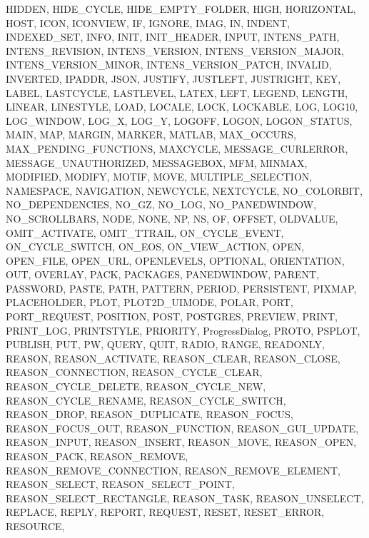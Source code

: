 {{    HIDDEN,
    HIDE_CYCLE,
    HIDE_EMPTY_FOLDER,
    HIGH,
    HORIZONTAL,
    HOST,
    ICON,
    ICONVIEW,
    IF,
    IGNORE,
    IMAG,
    IN,
    INDENT,
    INDEXED_SET,
    INFO,
    INIT,
    INIT_HEADER,
    INPUT,
    INTENS_PATH,
    INTENS_REVISION,
    INTENS_VERSION,
    INTENS_VERSION_MAJOR,
    INTENS_VERSION_MINOR,
    INTENS_VERSION_PATCH,
    INVALID,
    INVERTED,
    IPADDR,
    JSON,
    JUSTIFY,
    JUSTLEFT,
    JUSTRIGHT,
    KEY,
    LABEL,
    LASTCYCLE,
    LASTLEVEL,
    LATEX,
    LEFT,
    LEGEND,
    LENGTH,
    LINEAR,
    LINESTYLE,
    LOAD,
    LOCALE,
    LOCK,
    LOCKABLE,
    LOG,
    LOG10,
    LOG_WINDOW,
    LOG_X,
    LOG_Y,
    LOGOFF,
    LOGON,
    LOGON_STATUS,
    MAIN,
    MAP,
    MARGIN,
    MARKER,
    MATLAB,
    MAX_OCCURS,
    MAX_PENDING_FUNCTIONS,
    MAXCYCLE,
    MESSAGE_CURLERROR,
    MESSAGE_UNAUTHORIZED,
    MESSAGEBOX,
    MFM,
    MINMAX,
    MODIFIED,
    MODIFY,
    MOTIF,
    MOVE,
    MULTIPLE_SELECTION,
    NAMESPACE,
    NAVIGATION,
    NEWCYCLE,
    NEXTCYCLE,
    NO_COLORBIT,
    NO_DEPENDENCIES,
    NO_GZ,
    NO_LOG,
    NO_PANEDWINDOW,
    NO_SCROLLBARS,
    NODE,
    NONE,
    NP,
    NS,
    OF,
    OFFSET,
    OLDVALUE,
    OMIT_ACTIVATE,
    OMIT_TTRAIL,
    ON_CYCLE_EVENT,
    ON_CYCLE_SWITCH,
    ON_EOS,
    ON_VIEW_ACTION,
    OPEN,
    OPEN_FILE,
    OPEN_URL,
    OPENLEVELS,
    OPTIONAL,
    ORIENTATION,
    OUT,
    OVERLAY,
    PACK,
    PACKAGES,
    PANEDWINDOW,
    PARENT,
    PASSWORD,
    PASTE,
    PATH,
    PATTERN,
    PERIOD,
    PERSISTENT,
    PIXMAP,
    PLACEHOLDER,
    PLOT,
    PLOT2D_UIMODE,
    POLAR,
    PORT,
    PORT_REQUEST,
    POSITION,
    POST,
    POSTGRES,
    PREVIEW,
    PRINT,
    PRINT_LOG,
    PRINTSTYLE,
    PRIORITY,
    ProgressDialog,
    PROTO,
    PSPLOT,
    PUBLISH,
    PUT,
    PW,
    QUERY,
    QUIT,
    RADIO,
    RANGE,
    READONLY,
    REASON,
    REASON_ACTIVATE,
    REASON_CLEAR,
    REASON_CLOSE,
    REASON_CONNECTION,
    REASON_CYCLE_CLEAR,
    REASON_CYCLE_DELETE,
    REASON_CYCLE_NEW,
    REASON_CYCLE_RENAME,
    REASON_CYCLE_SWITCH,
    REASON_DROP,
    REASON_DUPLICATE,
    REASON_FOCUS,
    REASON_FOCUS_OUT,
    REASON_FUNCTION,
    REASON_GUI_UPDATE,
    REASON_INPUT,
    REASON_INSERT,
    REASON_MOVE,
    REASON_OPEN,
    REASON_PACK,
    REASON_REMOVE,
    REASON_REMOVE_CONNECTION,
    REASON_REMOVE_ELEMENT,
    REASON_SELECT,
    REASON_SELECT_POINT,
    REASON_SELECT_RECTANGLE,
    REASON_TASK,
    REASON_UNSELECT,
    REPLACE,
    REPLY,
    REPORT,
    REQUEST,
    RESET,
    RESET_ERROR,
    RESOURCE,
}}
